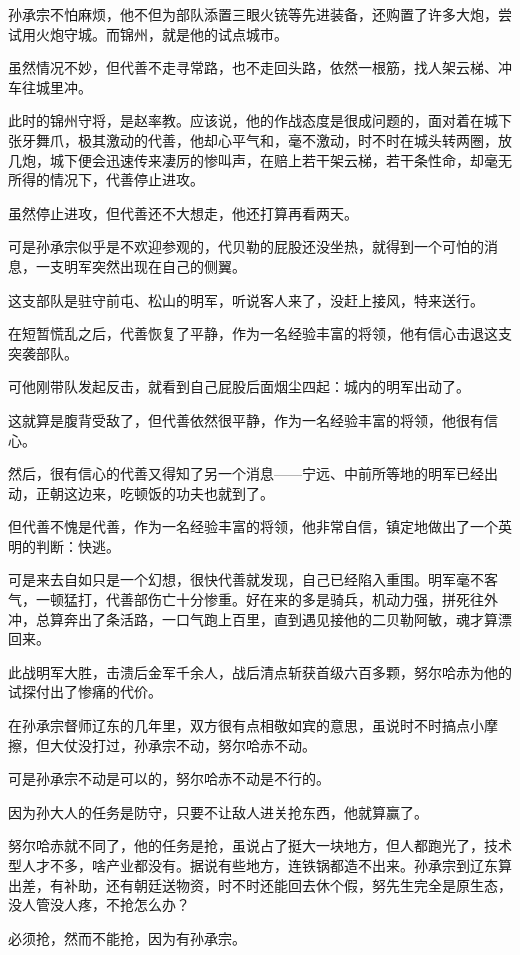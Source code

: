 \begin{multicols}{\theparacolNo}
孙承宗不怕麻烦，他不但为部队添置三眼火铳等先进装备，还购置了许多大炮，尝试用火炮守城。而锦州，就是他的试点城市。

虽然情况不妙，但代善不走寻常路，也不走回头路，依然一根筋，找人架云梯、冲车往城里冲。

此时的锦州守将，是赵率教。应该说，他的作战态度是很成问题的，面对着在城下张牙舞爪，极其激动的代善，他却心平气和，毫不激动，时不时在城头转两圈，放几炮，城下便会迅速传来凄厉的惨叫声，在赔上若干架云梯，若干条性命，却毫无所得的情况下，代善停止进攻。

虽然停止进攻，但代善还不大想走，他还打算再看两天。

可是孙承宗似乎是不欢迎参观的，代贝勒的屁股还没坐热，就得到一个可怕的消息，一支明军突然出现在自己的侧翼。

这支部队是驻守前屯、松山的明军，听说客人来了，没赶上接风，特来送行。

在短暂慌乱之后，代善恢复了平静，作为一名经验丰富的将领，他有信心击退这支突袭部队。

可他刚带队发起反击，就看到自己屁股后面烟尘四起：城内的明军出动了。

这就算是腹背受敌了，但代善依然很平静，作为一名经验丰富的将领，他很有信心。

然后，很有信心的代善又得知了另一个消息——宁远、中前所等地的明军已经出动，正朝这边来，吃顿饭的功夫也就到了。

但代善不愧是代善，作为一名经验丰富的将领，他非常自信，镇定地做出了一个英明的判断：快逃。

可是来去自如只是一个幻想，很快代善就发现，自己已经陷入重围。明军毫不客气，一顿猛打，代善部伤亡十分惨重。好在来的多是骑兵，机动力强，拼死往外冲，总算奔出了条活路，一口气跑上百里，直到遇见接他的二贝勒阿敏，魂才算漂回来。

此战明军大胜，击溃后金军千余人，战后清点斩获首级六百多颗，努尔哈赤为他的试探付出了惨痛的代价。

在孙承宗督师辽东的几年里，双方很有点相敬如宾的意思，虽说时不时搞点小摩擦，但大仗没打过，孙承宗不动，努尔哈赤不动。

可是孙承宗不动是可以的，努尔哈赤不动是不行的。

因为孙大人的任务是防守，只要不让敌人进关抢东西，他就算赢了。

努尔哈赤就不同了，他的任务是抢，虽说占了挺大一块地方，但人都跑光了，技术型人才不多，啥产业都没有。据说有些地方，连铁锅都造不出来。孙承宗到辽东算出差，有补助，还有朝廷送物资，时不时还能回去休个假，努先生完全是原生态，没人管没人疼，不抢怎么办？

必须抢，然而不能抢，因为有孙承宗。


\end{multicols}
